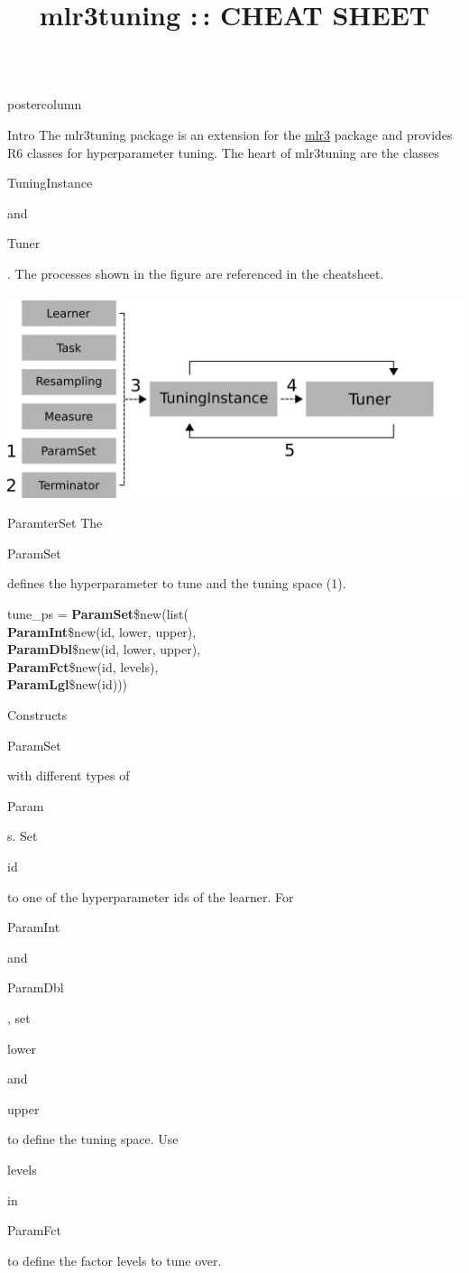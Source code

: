 \documentclass{beamer}
\title{mlr3tuning :\,: CHEAT SHEET} %
\newlength{\columnheight} %
\newcommand{\codeinline}[1]{\begin{codeboxinline}#1\end{codeboxinline}}
\begin{document}
\begin{frame}[fragile]{}
	\begin{columns}
		\begin{column}{.245\textwidth}
			\begin{beamercolorbox}[center]{postercolumn}
				\begin{minipage}{.98\textwidth}
					\parbox[t][\columnheight]{\textwidth}{
						\begin{myblock}{Intro}
							The mlr3tuning package is an extension for the \href{https://github.com/mlr-org/mlr3}{mlr3} package and provides R6 classes for hyperparameter tuning. The heart of mlr3tuning are the classes \codeinline{TuningInstance} and \codeinline{Tuner}. The processes shown in the figure are referenced in the cheatsheet. 
							\\
							\\
							\includegraphics[width=\textwidth]{img/tuning_objects.png}
						\end{myblock}
						\begin{myblock}{ParamterSet}
							The \codeinline{ParamSet} defines the hyperparameter to tune and the tuning space (1).
							\\
							\begin{codeboxmultiline}[width=21cm]
								tune\_ps = \textbf{ParamSet}\$new(list(\\
								\hspace*{1ex}\textbf{ParamInt}\$new(id, lower, upper),\\
								\hspace*{1ex}\textbf{ParamDbl}\$new(id, lower, upper),\\
								\hspace*{1ex}\textbf{ParamFct}\$new(id, levels),\\
								\hspace*{1ex}\textbf{ParamLgl}\$new(id)))
							\end{codeboxmultiline}
							Constructs \codeinline{ParamSet} with different types of \codeinline{Param}s. Set \codeinline{id} to one of the hyperparameter ids of the learner. For  \codeinline{ParamInt} and \codeinline{ParamDbl}, set \codeinline{lower} and \codeinline{upper} to define the tuning space. Use \codeinline{levels} in \codeinline{ParamFct} to define the factor levels to tune over.

\end{myblock}}
\end{minipage}
\end{beamercolorbox}
\end{column}
\end{columns}
\end{frame}
\end{document}
